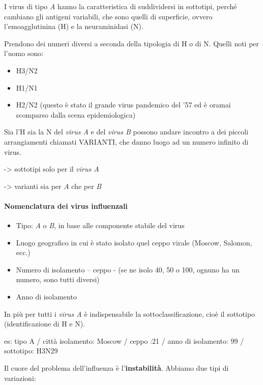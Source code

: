   I virus di tipo \emph{A} hanno la caratteristica di suddividersi in
  sottotipi, perché cambiano gli antigeni variabili, che sono quelli di
  superficie, ovvero l'emoagglutinina (H) e la neuraminidasi (N).

  Prendono dei numeri diversi a seconda della tipologia di H o di N.
  Quelli noti per l'uomo sono:

\begin{itemize}
\item
  H3/N2
\item
  H1/N1
\item
  H2/N2 (questo è stato il grande virus pandemico del '57 ed è oramai
  scomparso dalla scena epidemiologica)
\end{itemize}
  Sia l'H sia la N del \emph{virus A} e del \emph{virus B} possono
  andare incontro a dei piccoli arrangiamenti chiamati VARIANTI, che
  danno luogo ad un numero infinito di virus.

  -> sottotipi solo per il \emph{virus A}

  -> varianti sia per \emph{A} che per \emph{B}

\paragraph{Nomenclatura dei virus influenzali}
\begin{itemize}
\item Tipo: \emph{A} o \emph{B}, in base alle componente stabile del virus
\item Luogo geografico in cui è stato isolato quel ceppo virale (Moscow,
  Salomon, ecc.)
\item Numero di isolamento -- ceppo - (se ne isolo 40, 50 o 100, ognuno ha
  un numero, sono tutti diversi)
\item Anno di isolamento
\end{itemize}
  In più per tutti i \emph{virus A} è indispensabile la
  sottoclassificazione, cioè il sottotipo (identificazione di H e N).

  es: tipo A / città isolamento: Moscow / ceppo :21 / anno di
  isolamento: 99 / sottotipo: H3N29

  Il cuore del problema dell'influenza è l'\textbf{instabilità}. Abbiamo
  due tipi di variazioni:

